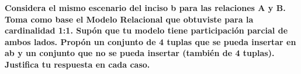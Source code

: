 \textbf{Considera el mismo escenario del inciso b para las relaciones A y B. Toma como base el Modelo Relacional que
obtuviste para la cardinalidad 1:1. Supón que tu modelo tiene participación parcial de ambos lados. Propón un
conjunto de 4 tuplas que se pueda insertar en ab y un conjunto que no se pueda insertar (también de 4 tuplas).
Justifica tu respuesta en cada caso.}\vspace{.3cm}
